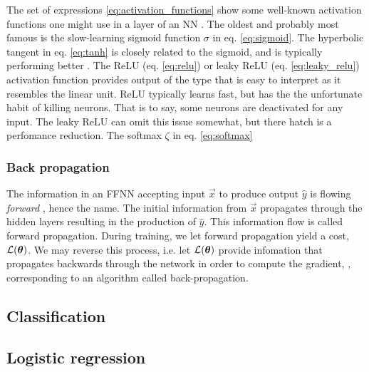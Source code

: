     The set of expressions \eqref{eq:activation_functions} show some well-known activation functions one might use in a layer of an NN . The oldest and probably most famous is the slow-learning sigmoid function $\sigma$ in eq. \eqref{eq:sigmoid}. The hyperbolic tangent in eq. \eqref{eq:tanh} is closely related to the sigmoid, and is typically performing better \citep{Goodfellow2016}. The ReLU (eq. \eqref{eq:relu}) or leaky ReLU (eq. \eqref{eq:leaky_relu}) activation function provides output of the type that is easy to interpret as it resembles the linear unit. ReLU typically learns fast, but has the the unfortunate habit of killing neurons. That is to say, some neurons are deactivated for any input. The leaky ReLU can omit this issue somewhat, but there hatch is a perfomance reduction. The softmax $\zeta$ in eq. \eqref{eq:softmax} \fillertext

    





    \subsubsection{Back propagation}\label{sec:back_propagation}


    The information in an FFNN accepting input $\vec{x}$ to produce output $\hat{y}$  is flowing \textit{forward} \citep{Goodfellow2016}, hence the name. The initial information from $\vec{x}$ propagates through the hidden layers resulting in the production of $\hat{y}$. This information flow is called forward propagation. During training, we let forward propagation yield a cost, $\mathcal{L}(\boldsymbol{\theta})$. We may reverse this process, i.e. let $\mathcal{L}(\boldsymbol{\theta})$ provide infomation that propagates backwards through the network in order to compute the gradient, , corresponding to an algorithm called back-propagation.


\subsection{Classification}\label{sec:classification}

\subsection{Logistic regression}\label{sec:logistic_regression}

